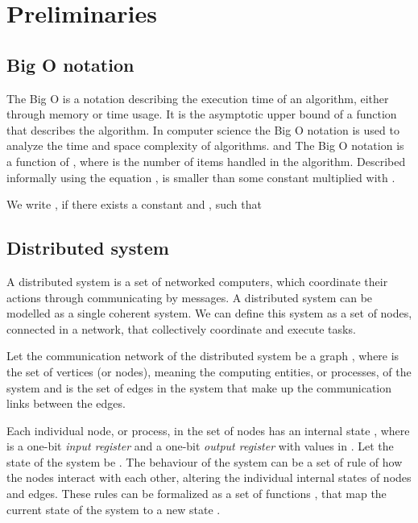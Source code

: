 \section{Preliminaries}


\subsection{Big O notation}

 The Big O is a notation describing the execution time of an algorithm, either through memory or time usage. It is the asymptotic upper bound of a function that describes the algorithm. In computer science the Big O notation is used to analyze the time and space complexity of algorithms. and The Big O notation is a function of , where  is the number of items handled in the algorithm. Described informally using the equation ,  is smaller than some constant multiplied with .

 \begin{definition}
 We write , if there exists a constant
  and , such that 
 \end{definition}
\subsection{Distributed system}

A distributed system is a set of networked computers, which coordinate their actions through communicating by messages. A distributed system can be modelled as a single coherent system. We can define this system as a set of nodes, connected in a network, that collectively coordinate and execute tasks.

Let the communication network of the distributed system be a graph , where  is the set of vertices (or nodes), meaning the computing entities, or processes, of the system and  is the set of edges in the system that make up the communication links between the edges.

Each individual node, or process, in the set of nodes  has an internal state , where  is a one-bit \emph{input register} and  a one-bit \emph{output register} with values in . Let the state of the system be  . The behaviour of the system can be a set of rule of how the nodes interact with each other, altering the individual internal states of nodes and edges. These rules can be formalized as a set of functions , that map the current state of the system  to a new state .

